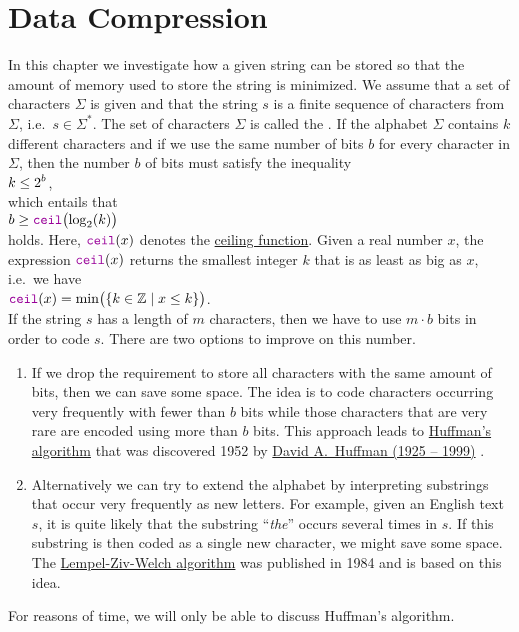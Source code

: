 \chapter{Data Compression}
In this chapter we investigate how a given string can be stored so that the amount of memory used to store the
string is minimized.   We assume that a set of characters $\Sigma$ is given and that the string $s$ is a finite
sequence of characters from $\Sigma$, i.e.~$s \in \Sigma^*$.  The set of characters $\Sigma$ is called the
.  If the alphabet $\Sigma$ contains $k$ different characters and if we use the same number of
bits $b$ for every character in $\Sigma$, then the number $b$ of bits must satisfy the inequality
\\[0.2cm]
\hspace*{1.3cm}
$\displaystyle k \leq 2^b$,
\\[0.2cm]
which entails that 
\\[0.2cm]
\hspace*{1.3cm}
$b \geq \mytt{ceil}\bigl(\log_2(k)\bigr)$
\\[0.2cm]
holds.  Here, $\mytt{ceil}(x)$ denotes the
\href{https://en.wikipedia.org/wiki/Floor_and_ceiling_functions}{ceiling function}.  Given a real number $x$,
the expression $\mytt{ceil}(x)$ returns the smallest integer $k$ that is as least as big as $x$, i.e.~we have
\\[0.2cm]
\hspace*{1.3cm}
$\mytt{ceil}(x) = \min\bigl( \{ k \in \mathbb{Z} \mid x \leq k \}\bigr)$. 
\\[0.2cm]
If the string $s$ has a length of $m$ characters, then we have to use $m \cdot b$ bits in order to code $s$. 
There are two options to improve on this number.
\begin{enumerate}
\item If we drop the requirement to store all characters with the same amount of bits, then we can save some space.
      The idea is to code characters occurring very frequently with fewer than $b$ bits while those characters
      that are very rare are encoded using more than $b$ bits.  This approach leads to 
      \href{https://en.wikipedia.org/wiki/Huffman_coding}{Huffman's algorithm} that was discovered 1952 by 
      \href{https://en.wikipedia.org/wiki/David_A._Huffman}{David A.~Huffman (1925 -- 1999)} \cite{huffman:52}.
\item Alternatively we can try to extend the alphabet by interpreting substrings that occur very frequently as
      new letters.  For example, given an English text $s$, it is quite likely that the substring 
      ``\emph{the}'' occurs several times in $s$.  If this substring is then coded as a single new character,
      we might save some space.  The 
      \href{https://en.wikipedia.org/wiki/Lempel-Ziv-Welch}{Lempel-Ziv-Welch algorithm} 
      \cite{ziv:77,ziv:78,welch:84} was published in 1984 and is based on this idea.

\end{enumerate}
For reasons of time, we will only be able to discuss Huffman's algorithm.

